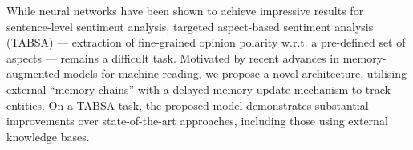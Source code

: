 While neural networks have been shown to achieve impressive results for sentence-level sentiment analysis, targeted aspect-based sentiment analysis (TABSA) --- extraction of fine-grained opinion polarity w.r.t. a pre-defined set of aspects --- remains a difficult task. Motivated by recent advances in memory-augmented models for machine reading, we propose a novel architecture, utilising external ``memory chains'' with a delayed memory update mechanism to track entities. On a TABSA task, the proposed model demonstrates substantial improvements over state-of-the-art approaches, including those using external knowledge bases.
